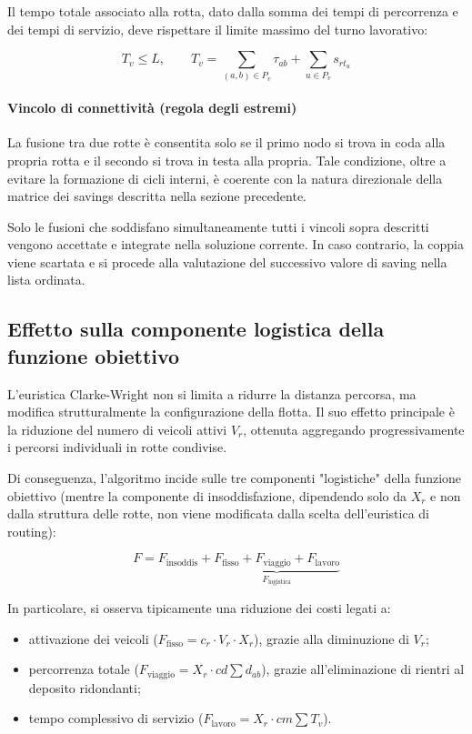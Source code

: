 Il tempo totale associato alla rotta, dato dalla somma dei tempi di percorrenza e dei tempi di servizio, deve rispettare il limite massimo del turno lavorativo:

\[
T_v \leq L, \qquad T_v = \sum_{(a,b) \in P_v} \tau_{ab} + \sum_{u \in P_v} s_{r t_u}
\]

\paragraph{Vincolo di connettività (regola degli estremi)}

La fusione tra due rotte è consentita solo se il primo nodo si trova in coda alla propria rotta e il secondo si trova in testa alla propria. Tale condizione, oltre a evitare la formazione di cicli interni, è coerente con la natura direzionale della matrice dei savings descritta nella sezione precedente.

\medskip

Solo le fusioni che soddisfano simultaneamente tutti i vincoli sopra descritti vengono accettate e integrate nella soluzione corrente. In caso contrario, la coppia viene scartata e si procede alla valutazione del successivo valore di saving nella lista ordinata.

\subsection{Effetto sulla componente logistica della funzione obiettivo}

L'euristica Clarke-Wright non si limita a ridurre la distanza percorsa, ma modifica strutturalmente la configurazione della flotta. Il suo effetto principale è la riduzione del numero di veicoli attivi $V_r$, ottenuta aggregando progressivamente i percorsi individuali in rotte condivise.

Di conseguenza, l'algoritmo incide sulle tre componenti "logistiche" della funzione obiettivo (mentre la componente di insoddisfazione, dipendendo solo da $X_r$ e non dalla struttura delle rotte, non viene modificata dalla scelta dell'euristica di routing):

\[
F = F_{\text{insoddis}} + \underbrace{F_{\text{fisso}} + F_{\text{viaggio}} + F_{\text{lavoro}}}_{F_{\text{logistica}}}
\]

In particolare, si osserva tipicamente una riduzione dei costi legati a:
\begin{itemize}
	\item attivazione dei veicoli ($F_{\text{fisso}} = c_r \cdot V_r \cdot X_r$), grazie alla diminuzione di $V_r$;
	\item percorrenza totale ($F_{\text{viaggio}} = X_r \cdot cd \sum d_{ab}$), grazie all'eliminazione di rientri al deposito ridondanti;
	\item tempo complessivo di servizio ($F_{\text{lavoro}} = X_r \cdot cm \sum T_v$).
\end{itemize}

